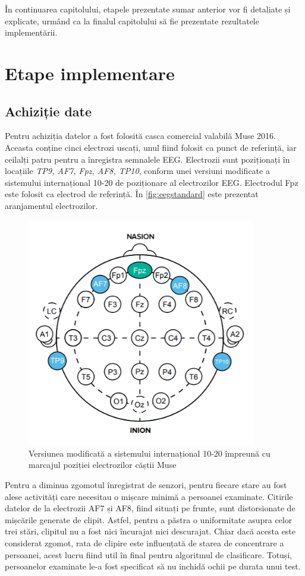 În continuarea capitolului, etapele prezentate sumar anterior vor fi detaliate și explicate, urmând ca la finalul capitolului să fie prezentate rezultatele implementării.

\section{Etape implementare}

\subsection{Achiziție date}
Pentru achiziția datelor a fost folosită casca comercial valabilă Muse 2016. Aceasta conține cinci electrozi uscați, unul fiind folosit ca punct de referință, iar ceilalți patru pentru a înregistra semnalele EEG. Electrozii sunt poziționați în locațiile \textit{TP9, AF7, Fpz, AF8, TP10}, conform unei versiuni modificate a sistemului internațional 10-20 de poziționare al electrozilor EEG. Electrodul Fpz este folosit ca electrod de referință. În \autoref{fig:eegstandard} este prezentat aranjamentul electrozilor.

\begin{figure}[ht]
\centering
\includegraphics[width=10cm, keepaspectratio]{fig/cap3/EEGstandard.png}
\caption{Versiunea modificată a sistemului internațional 10-20 împreună cu marcajul poziției electrozilor căștii Muse \cite{online:muse-eeg}}
\label{fig:eegstandard}
\end{figure}

Pentru a diminua zgomotul înregistrat de senzori, pentru fiecare stare au fost alese activități care necesitau o mișcare minimă a persoanei examinate. Citirile datelor de la electrozii AF7 și AF8, fiind situați pe frunte, sunt distorsionate de mișcările generate de clipit. Astfel, pentru a păstra o uniformitate asupra celor trei stări, clipitul nu a fost nici încurajat nici descurajat. Chiar dacă acesta este considerat zgomot, rata de clipire este influențată de starea de concentrare a persoanei, acest lucru fiind util în final pentru algoritmul de clasificare. Totuși, persoanelor examinate le-a fost specificat să nu inchidă ochii pe durata unui test.

